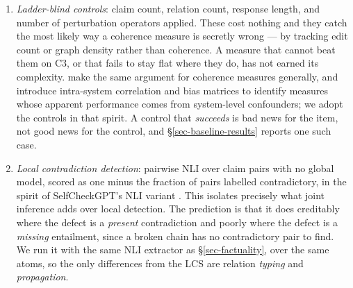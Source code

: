 \begin{enumerate}[leftmargin=1.6em,itemsep=2pt,topsep=3pt]
\item \emph{Ladder-blind controls}: claim count, relation count, response length, and number of
  perturbation operators applied. These cost nothing and they catch the most likely way a coherence
  measure is secretly wrong --- by tracking edit count or graph density rather than coherence. A
  measure that cannot beat them on C3, or that fails to stay flat where they do, has not earned its
  complexity. \citet{steenmarkert} make the same argument for coherence measures generally, and
  introduce intra-system correlation and bias matrices to identify measures whose apparent
  performance comes from system-level confounders; we adopt the controls in that spirit. A control
  that \emph{succeeds} is bad news for the item, not good news for the control, and
  \S\ref{sec-baseline-results} reports one such case.
\item \emph{Local contradiction detection}: pairwise NLI over claim pairs with no global model, scored
  as one minus the fraction of pairs labelled contradictory, in the spirit of SelfCheckGPT's NLI
  variant \citep{selfcheckgpt}. This isolates precisely what joint inference adds over local
  detection. The prediction is that it does creditably where the defect is a \emph{present}
  contradiction and poorly where the defect is a \emph{missing} entailment, since a broken chain has
  no contradictory pair to find. We run it with the same NLI extractor as \S\ref{sec-factuality},
  over the same atoms, so the only differences from the LCS are relation \emph{typing} and
  \emph{propagation}.


\end{enumerate}
